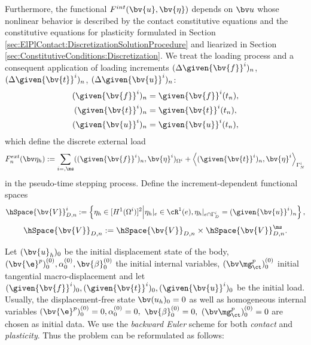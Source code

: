 Furthermore, the functional $F^{int}(\bv{u},\bv{\eta})$ depends on $\bv u$ whose nonlinear behavior is described by the contact constitutive equations and the constitutive equations for plasticity  formulated in Section \ref{sec:ElPlContact:DiscretizationSolutionProcedure} and liearized in Section \ref{sec:ConstitutiveConditions:Discretization}. We treat the loading process and a consequent application of loading increments $(\Delta \given{\bv{f}}^i)_n$, $(\Delta \given{\bv{t}}^i)_n$, $(\Delta \given{\bv{u}}^i)_n$:
\begin{align*}
(\given{\bv{f}}^i)_{n} &= \given{\bv{f}}^i(t_{n}), \\
(\given{\bv{t}}^i)_{n} &= \given{\bv{t}}^i(t_{n}), \\
(\given{\bv{u}}^i)_{n} &= \given{\bv{u}}^i(t_{n}),
\end{align*}
which define the discrete external load
\begin{equation}\nonumber
F^{ext}_{n}(\bv\eta_h) := \sum_{i=\sl,\ms} ((\given{\bv{f}}^i)_{n}, \bv{\eta}^i)_{\Omega^i}
+ \left\langle (\given{\bv{t}}^i)_{n}, \bv{\eta}^i \right\rangle_{\Gamma^i_N}
\end{equation}
in the pseudo-time stepping process. Define the increment-dependent functional spaces
\begin{equation}\nonumber
\hSpace{\bv{V}}^i_{D,n} := \left\lbrace \eta_h \in [H^1(\Omega^i)]^2 \middle| \eta_h|_e \in \cR^1(e), \eta_h|_{e \cap \Gamma_D^i} =  (\given{\bv{u}}^i)_{n} \right\rbrace,
\end{equation}
\begin{equation}\nonumber
\hSpace{\bv{V}}_{D,n} := \hSpace{\bv{V}}^{\sl}_{D,n} \times \hSpace{\bv{V}}^{\ms}_{D,n}.
\end{equation}

Let $(\bv{u}_{h})_0$ be the initial displacement state of the body, $(\bv{\e}^p)^{(0)}_0, \alpha^{(0)}_0, \bv{\beta}^{(0)}_0 $ the initial internal variables, $(\bv \mg^p_{\ct})^{(0)}_0$ initial tangential macro-displacement and let $(\given{\bv{f}}^i)_0, (\given{\bv{t}}^i)_0, (\given{\bv{u}}^i)_0$ be the initial load. Usually, the displacement-free state $\bv (u_h)_0=0$ as well as homogeneous internal variables $(\bv{\e}^p)^{(0)}_0 = 0, \alpha^{(0)}_0 = 0,$ $\bv{\beta}^{(0)}_0 = 0,$ $(\bv \mg^p_{\ct})^{(0)}_0 = 0$ are chosen as initial data. We use the {\it backward Euler} scheme for both {\it contact} and {\it plasticity}. Thus the problem can be reformulated as follows: 

